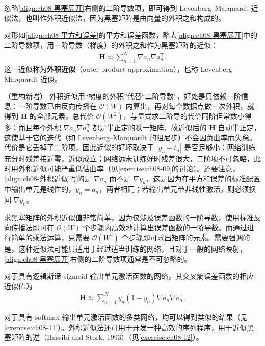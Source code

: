 \documentclass[../../main.tex]{subfiles}
\begin{document}
忽略\eqref{align:ch08-黑塞展开}右侧的二阶导数项，即可得到 Levenberg--Marquardt 近似法，也叫作外积近似法，因为黑塞矩阵是由向量的外积之和构成的。

\begin{definition}\label{definition:ch08-外积近似}
对形如\eqref{align:ch08-平方和误差}的平方和误差函数，略去\eqref{align:ch08-黑塞展开}中的二阶导数项，用一阶导数（梯度）的外积之和作为黑塞矩阵的近似：
\begin{align}
\mathbf{H}\approx\sum_{n=1}^{N}\nabla a_n\nabla a_n^{\mathsf T}.
\label{align:ch08-外积近似}
\end{align}
这一近似称为\textbf{外积近似}（outer product approximation），也称 Levenberg--Marquardt 近似。
\end{definition}

\begin{remark}（重构新增）
外积近似用“梯度的外积”代替“二阶导数”，好处是只依赖一阶信息：一阶导数已由反向传播在 $\mathcal{O}(W)$ 内算出，再对每个数据点做一次外积，就得到 $\mathbf{H}$ 的全部元素，总代价 $\mathcal{O}(W^{2})$，与显式求二阶导的代价同阶但常数小得多；而且每个外积 $\nabla a_n\nabla a_n^{\mathsf T}$ 都是半正定的秩一矩阵，故近似后的 $\mathbf{H}$ 自动半正定，这使基于它的迭代（如 Levenberg--Marquardt 的阻尼步）不会因负曲率而失稳。代价是它丢掉了二阶项，因此近似的好坏取决于 $|y_n-t_n|$ 是否足够小：网络训练充分时残差接近零，近似成立；网络远未训练好时残差很大，二阶项不可忽略，此时用外积近似可能严重低估曲率（见\cref{exercise:ch08-09}的讨论）。还要注意，\eqref{align:ch08-外积近似}写的是 $\nabla a_n$ 而不是 $\nabla y_n$，这是因为在平方和误差的标准配置中输出单元是线性的，$y_n=a_n$，两者相同；若输出单元带非线性激活，则必须换回 $\nabla y_n$。
\end{remark}

求黑塞矩阵的外积近似值非常简单，因为仅涉及误差函数的一阶导数，使用标准反向传播法即可在 $\mathcal{O}(W)$ 个步骤内高效地计算出误差函数的一阶导数。而通过进行简单的乘法运算，只需要 $\mathcal{O}(W^{2})$ 个步骤即可求出矩阵的元素。需要强调的是，这种近似法可能只适用于经过适当训练的网络，且对于一般的网络映射，\eqref{align:ch08-黑塞展开}右侧的二阶导数项通常是不可忽略的。

对于具有逻辑斯谛 sigmoid 输出单元激活函数的网络，其交叉熵误差函数的相应近似值为
\begin{align}
\mathbf{H}\approx\sum_{n=1}^{N}y_n\left(1-y_n\right)\nabla a_n\nabla a_n^{\mathsf T}.
\label{align:ch08-外积交叉熵}
\end{align}

对于具有 softmax 输出单元激活函数的多类网络，均可以得到类似的结果（见\cref{exercise:ch08-11}）。外积近似法还可用于开发一种高效的序列程序，用于近似黑塞矩阵的逆（Hassibi and Stork, 1993）（见\cref{exercise:ch08-12}）。
\end{document}
